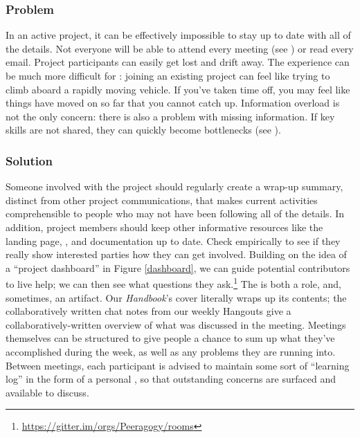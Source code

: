 \subsubsection*{Problem} In an active project, it can be effectively impossible to stay up to date with all of the details.  Not everyone will be able to attend every meeting (see ) or read every email.  Project participants can easily get lost and drift away.  The experience can be much more difficult for : joining an existing project can feel like trying to climb aboard a rapidly moving vehicle.  If you've taken time off, you may feel like things have moved on so far that you cannot catch up.  Information overload is not the only concern: there is also a problem with missing information.  If key skills are not shared, they can quickly become bottlenecks (see ).

\subsubsection*{Solution}
Someone involved with the project should regularly create a wrap-up
summary, distinct from other project communications, that makes
current activities comprehensible to people who may not have been
following all of the details.  In addition, project members should
keep other informative resources like the landing page,
, and documentation up to date.  Check
empirically to see if they really show interested parties how they can
get involved.  Building on the idea of a ``project
dashboard'' in Figure \ref{dashboard}, we can guide potential
contributors to live help; we can then see what questions they
ask.\footnote{\url{https://gitter.im/orgs/Peeragogy/rooms}}  The
 is both a role, and, sometimes, an artifact.
Our \emph{Handbook}'s cover literally wraps up its contents; the
collaboratively written chat notes from our weekly Hangouts give a
collaboratively-written overview of what was discussed in the meeting.
Meetings themselves can be structured to give people a chance to sum
up what they've accomplished during the week, as well as any problems
they are running into.  Between meetings, each participant is advised
to maintain some sort of ``learning log'' in the form of a personal
, so that outstanding concerns are surfaced and
available to discuss.

